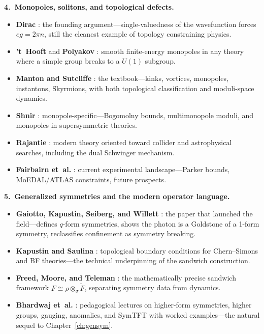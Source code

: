 \medskip
\noindent\textbf{4.\ Monopoles, solitons, and topological defects.}
\begin{itemize}
\item \textbf{Dirac} \cite{Dirac1931QuantisedSingularities}: the founding argument---single-valuedness of the wavefunction forces $eg = 2\pi n$, still the cleanest example of topology constraining physics.
\item \textbf{'t~Hooft} \cite{tHooft1974MagneticMonopoles} and \textbf{Polyakov} \cite{Polyakov1974ParticleSpectrum}: smooth finite-energy monopoles in any theory where a simple group breaks to a $U(1)$ subgroup.
\item \textbf{Manton and Sutcliffe} \cite{MantonSutcliffeTopologicalSolitons}: the textbook---kinks, vortices, monopoles, instantons, Skyrmions, with both topological classification and moduli-space dynamics.
\item \textbf{Shnir} \cite{ShnirMagneticMonopoles}: monopole-specific---Bogomolny bounds, multimonopole moduli, and monopoles in supersymmetric theories.
\item \textbf{Rajantie} \cite{Rajantie2024MonopoleTheoryOverview}: modern theory oriented toward collider and astrophysical searches, including the dual Schwinger mechanism.
\item \textbf{Fairbairn et~al.} \cite{FairbairnMonopolesRevisited}: current experimental landscape---Parker bounds, MoEDAL/ATLAS constraints, future prospects.
\end{itemize}

\medskip
\noindent\textbf{5.\ Generalized symmetries and the modern operator language.}
\begin{itemize}
\item \textbf{Gaiotto, Kapustin, Seiberg, and Willett} \cite{GaiottoKapustinSeibergWillett2015GeneralizedSymmetries}: the paper that launched the field---defines $q$-form symmetries, shows the photon is a Goldstone of a 1-form symmetry, reclassifies confinement as symmetry breaking.
\item \textbf{Kapustin and Saulina} \cite{KapustinSaulinaLineOperatorsPlaceholder}: topological boundary conditions for Chern--Simons and BF theories---the technical underpinning of the sandwich construction.
\item \textbf{Freed, Moore, and Teleman} \cite{FreedMooreTeleman2024TopologicalSymmetry}: the mathematically precise sandwich framework $F \cong \rho \otimes_\sigma \widetilde{F}$, separating symmetry data from dynamics.
\item \textbf{Bhardwaj et~al.} \cite{Bhardwaj2023GeneralizedSymmetryLectures}: pedagogical lectures on higher-form symmetries, higher groups, gauging, anomalies, and SymTFT with worked examples---the natural sequel to Chapter~\ref{ch:gensym}.
\end{itemize}

